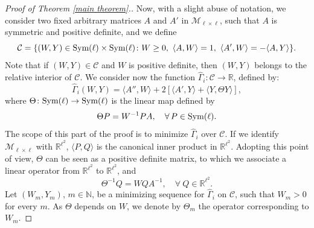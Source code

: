\documentclass[12pt]{amsart}
\newcommand{\R}{\mathbb R}
\newcommand{\N}{\mathbb N}
\newcommand{\1}{\mathbf 1}
\newcommand{\symm}{\mbox{\rm Sym}}
\newcommand{\M}{{\mathcal M}}
\begin{document}
\begin{proof}[Proof of Theorem \ref{main theorem}.]
Now, with a slight abuse of notation, we consider two fixed arbitrary matrices $A$ and $A'$ in $\M_{\ell\times\ell}$, such that $A$ is symmetric and positive definite, and we define
\begin{equation}\label{constraint}
{\mathcal C}=\{(W,Y)\in\symm(\ell)\times\symm(\ell)\colon W\ge0,\ \langle A,W\rangle=1,\ \langle A',W\rangle=-\langle A,Y\rangle\}.
\end{equation}
Note that if $(W,Y)\in{\mathcal C}$ and $W$ is positive definite, then $(W,Y)$ belongs to the relative interior of $\mathcal C$. We consider now the function $\hat\Gamma_i\colon{\mathcal C}\to\R$, defined by:
\begin{equation}\label{bilinear2}
\hat\Gamma_i(W,Y)=\langle A'', W\rangle+2\left[\langle A',Y\rangle+\langle Y,\Theta Y\rangle\right],
\end{equation}
where $\Theta\colon\symm(\ell)\to\symm(\ell)$ is the linear map defined by
$$
\Theta P=W^{-1}PA,\quad\forall\, P\in\symm(\ell).
$$
The scope of this part of the proof is to minimize $\hat \Gamma_i$ over $\mathcal C$. If we identify $\M_{\ell\times\ell}$ with $\R^{\ell^2}$, $\langle P,Q\rangle$ is the canonical inner product in $\R^{\ell^2}$. Adopting this point of view, $\Theta$ can be seen as a positive definite matrix, to which we associate a linear operator from $\R^{\ell^2}$ to $\R^{\ell^2}$, and
\begin{equation}\label{theta -1}
\Theta^{-1}Q=WQA^{-1},\quad\forall\ Q\in\R^{\ell^2}.
\end{equation}
Let $(W_m, Y_m)$, $m\in\N$, be a minimizing sequence for $\hat \Gamma_i$ on $\mathcal C$, such that $W_m>0$ for every $m$. As $\Theta$ depends on $W$, we denote by $\Theta_m$ the operator corresponding to $W_m$.


\end{proof}
\end{document}
